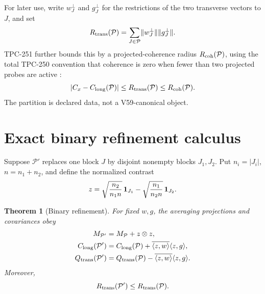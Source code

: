 \documentclass[10pt]{article}
\newtheorem{theorem}{Theorem}
\newcommand{\ip}[2]{\langle #1,#2\rangle}
\newcommand{\norm}[1]{\lVert #1\rVert}
\newcommand{\conj}[1]{\overline{#1}}
\newcommand{\M}{M_{\mathcal P}}
\newcommand{\Mp}{M_{\mathcal P'}}
\begin{document}
For later use, write $w_J^\perp$ and $g_J^\perp$ for the restrictions of the
two transverse vectors to $J$, and set
\begin{equation}\label{eq:rtrans}
 R_{\rm trans}(\mathcal P)
 =\sum_{J\in\mathcal P}\norm{w_J^\perp}\norm{g_J^\perp}.
\end{equation}
TPC-251 further bounds this by a projected-coherence radius
$R_{\rm coh}(\mathcal P)$, using the total TPC-250 convention that coherence
is zero when fewer than two projected probes are active \cite{tpc250}:
\begin{equation}\label{eq:tpc251}
 |C_x-C_{\rm long}(\mathcal P)|
 \leq R_{\rm trans}(\mathcal P)\leq R_{\rm coh}(\mathcal P).
\end{equation}
The partition is declared data, not a V59-canonical object.

\section{Exact binary refinement calculus}

Suppose $\mathcal P'$ replaces one block $J$ by disjoint nonempty blocks
$J_1,J_2$.  Put $n_i=|J_i|$, $n=n_1+n_2$, and define the normalized contrast
\begin{equation}\label{eq:z}
 z=\sqrt{\frac{n_2}{n_1n}}\,{\bf1}_{J_1}
   -\sqrt{\frac{n_1}{n_2n}}\,{\bf1}_{J_2}.
\end{equation}

\begin{theorem}[Binary refinement]\label{thm:binary}
For fixed $w,g$, the averaging projections and covariances obey
\begin{align}
 \Mp&=\M+z\otimes z,\label{eq:mupdate}\\
 C_{\rm long}(\mathcal P')
 &=C_{\rm long}(\mathcal P)+\conj{\ip{z}{w}}\ip{z}{g},\label{eq:cupdate}\\
 Q_{\rm trans}(\mathcal P')
 &=Q_{\rm trans}(\mathcal P)-\conj{\ip{z}{w}}\ip{z}{g}.
 \label{eq:qupdate}
\end{align}
Moreover,
\begin{equation}\label{eq:rmono}
 R_{\rm trans}(\mathcal P')\leq R_{\rm trans}(\mathcal P).
\end{equation}
\end{theorem}
\end{document}
